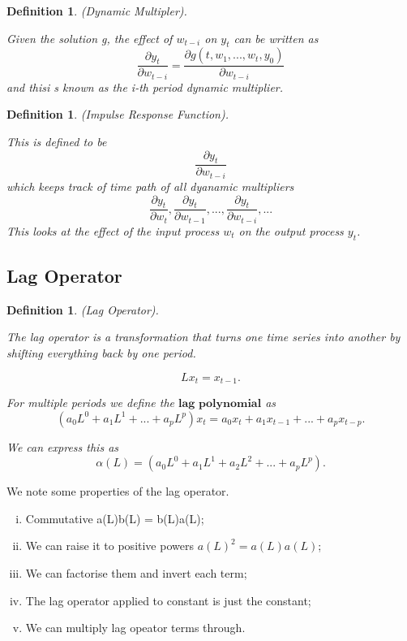 \documentclass[twoside]{article}
\newtheorem{definition}[theorem]{Definition}
\begin{document}
\begin{definition}(Dynamic Multipler).

Given the solution g, the effect of $w_{t-i}$ on $y_t$ can be written as
$$
\frac{\partial y_t}{\partial w_{t-i}} = \frac{\partial g(t,w_1,...,w_t,y_0)}{\partial w_{t-i}}
$$
and thisi s known as the i-th period dynamic multiplier.
\end{definition}

\begin{definition}(Impulse Response Function).

This is defined to be
$$
\frac{\partial y_t}{\partial w_{t-i}}
$$
which keeps track of time path of all dyanamic multipliers 
$$
\frac{\partial y_t}{\partial w_{t}},\frac{\partial y_t}{\partial w_{t-1}},...,\frac{\partial y_t}{\partial w_{t-i}},...
$$
This looks at the effect of the input process $w_t$ on the output process $y_t$.
\end{definition}

\subsection{Lag Operator}
\begin{definition}(Lag Operator).

The lag operator is a transformation that turns one time series into another by shifting everything back by one period. 

$$
Lx_t = x_{t-1}.
$$

For multiple periods we define the $\textbf{lag polynomial}$ as
$$
(a_0L^0 + a_1L^1 + ... + a_pL^p)x_t = a_0x_t + a_1x_{t-1} + ... + a_px_{t-p}.
$$

We can express this as 
$$
\alpha(L) = (a_0L^0 + a_1L^1 + a_2L^2 + ... + a_pL^p).
$$

\end{definition}

We note some properties of the lag operator.

\begin{enumerate}[(i)]
    \item Commutative a(L)b(L) = b(L)a(L);
    \item We can raise it to positive powers $a(L)^2 = a(L)a(L)$;
    \item We can factorise them and invert each term;
    \item The lag operator applied to constant is just the constant;
    \item We can multiply lag opeator terms through.
\end{enumerate}
\end{document}
